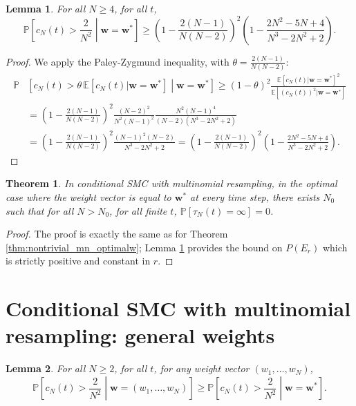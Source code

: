 \documentclass{article}
\newtheorem{thm}{Theorem}
\newtheorem{lemma}{Lemma}
\newcommand{\PR}{\mathbb{P}}
\newcommand{\E}{\mathbb{E}}
\begin{document}
\begin{lemma}\label{lem:csmc_cN_LB}
For all $N\geq 4$, for all $t$,
\begin{equation*}
\PR \left[c_N(t) > \frac{2}{N^2} \middle| \mathbf{w}=\mathbf{w}^*  \right] 
\geq \left( 1-\frac{2(N-1)}{N(N-2)} \right)^2 \left(1- \frac{2N^2-5N+4}{N^3-2N^2+2} \right) .
\end{equation*}
\end{lemma}

\begin{proof}
We apply the Paley-Zygmund inequality, with $\theta = \frac{2(N-1)}{N(N-2)}$:
\begin{align*}
\PR &\left[c_N(t) > \theta\,\E[c_N(t) | \mathbf{w} =\mathbf{w}^*] \middle| \mathbf{w} =\mathbf{w}^* \right] 
\geq (1-\theta)^2 \frac{\E[c_N(t) | \mathbf{w} =\mathbf{w}^*]^2}{\E[(c_N(t))^2 | \mathbf{w} =\mathbf{w}^*]} \\
&= \left( 1-\frac{2(N-1)}{N(N-2)} \right)^2  \frac{(N-2)^2}{N^2(N-1)^2} \frac{N^2(N-1)^4}{(N-2)(N^3-2N^2+2)} \\
&= \left( 1-\frac{2(N-1)}{N(N-2)} \right)^2  \frac{(N-1)^2 (N-2)}{N^3-2N^2+2} 
= \left( 1-\frac{2(N-1)}{N(N-2)} \right)^2 \left(1- \frac{2N^2-5N+4}{N^3-2N^2+2} \right) .
\end{align*}
\end{proof} 
 
\begin{thm}\label{thm:nontrivial_csmc_optimalw}
In conditional SMC with multinomial resampling, in the optimal case where the weight vector is equal to $\mathbf{w}^*$ at every time step, there exists $N_0$ such that for all $N>N_0$, for all finite $t$, $\PR[\tau_N(t) = \infty] =0$.
\end{thm}

\begin{proof}
The proof is exactly the same as for Theorem \ref{thm:nontrivial_mn_optimalw}; Lemma \ref{lem:csmc_cN_LB} provides the bound on $P(E_r)$ which is strictly positive and constant in $r$.
\end{proof}


\section*{Conditional SMC with multinomial resampling: general weights}

\begin{lemma}
For all $N\geq 2$, for all $t$, for any weight vector $(w_1, \dots, w_N)$,
\begin{equation*}
\PR \left[c_N(t) > \frac{2}{N^2} \middle| \mathbf{w}=(w_1, \dots, w_N) \right]
\geq \PR \left[c_N(t) > \frac{2}{N^2} \middle| \mathbf{w}=\mathbf{w}^* \right].
\end{equation*}
\end{lemma}
\end{document}
